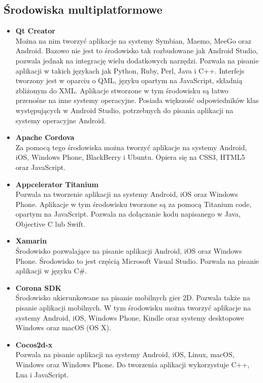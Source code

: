 \documentclass[eng]{mgr}
\begin{document}
			\subsection{Środowiska multiplatformowe}
			\begin{itemize}
				\item \textbf{Qt Creator}\\
				Można na nim tworzyć aplikacje na systemy Symbian, Maemo, MeeGo oraz Android. Bazowo nie jest to środowisko tak rozbudowane jak Android Studio, pozwala jednak na integrację wielu dodatkowych narzędzi. Pozwala na pisanie aplikacji w takich językach jak Python, Ruby, Perl, Java i C++. Interfejs tworzony jest w oparciu o QML, języku opartym na JavaScript, składnią zbliżonym do XML. Aplikacje stworzone w tym środowisku są łatwo przenośne na inne systemy operacyjne. Posiada większość odpowiedników klas występujących w Android Studio, potrzebnych do pisania aplikacji na systemy operacyjne Android.
				
				\item \textbf{Apache Cordova}\\
				Za pomocą tego środowiska można tworzyć aplikacje na systemy Android, iOS, Windows Phone, BlackBerry i Ubuntu. Opiera się na CSS3, HTML5 oraz JavaScript.
				
				\item \textbf{Appcelerator Titanium}\\
				Pozwala na tworzenie aplikacji na systemy Android, iOS oraz Windows Phone. Aplikacje w tym środowisku tworzone są za pomocą Titanium code, opartym na JavaScript. Pozwala na dołączanie kodu napisanego w Java, Objective C lub Swift.
				
				\item \textbf{Xamarin}\\
				Środowisko pozwalające na pisanie aplikacji Android, iOS oraz Windows Phone. Środowisko to jest częścią Microsoft Visual Studio. Pozwala na pisanie aplikacji w języku C\#.
				
				\item \textbf{Corona SDK}\\
				Środowisko ukierunkowane na pisanie mobilnych gier 2D. Pozwala także na pisanie aplikacji mobilnych. W tym środowisku można tworzyć aplikacje na systemy Android, iOS, Windows Phone, Kindle oraz systemy desktopowe Windows oraz macOS (OS X).
				
				\item \textbf{Cocos2d-x}\\
				Pozwala na pisanie aplikacji na systemy Android, iOS, Linux, macOS, Windows oraz Windows Phone. Do tworzenia aplikacji wykorzystuje C++, Lua i JavaScript.
				

\end{itemize}
\end{document}
